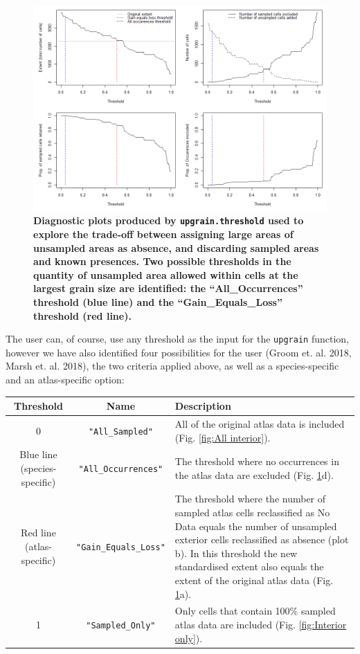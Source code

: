 \documentclass{article}[12pt, a4paper]
\begin{document}
\begin{figure}[ht]
\centering
\includegraphics[width=\linewidth]{Threshold_plots.png}
\caption{\textbf{Diagnostic plots produced by \texttt{upgrain.threshold} used to explore the trade-off  between assigning large areas of unsampled areas as absence, and discarding sampled areas and known presences. Two possible thresholds in the quantity of unsampled area allowed within cells at the largest grain size are identified: the “All\_Occurrences” threshold (blue line) and the “Gain\_Equals\_Loss” threshold (red line).}}
\label{fig:Threshold plots}
\end{figure}

The user can, of course, use any threshold as the input for the \texttt{upgrain} function, however we have also identified four possibilities for the user (Groom et. al. 2018, Marsh et. al. 2018), the two criteria applied above, as well as a species-specific and an atlas-specific option: 

\begin{table}[!h]
\centering
\begin{tabular}{ c  c  p{6.2cm} }
\hline \noalign{\smallskip}
Threshold & Name & Description  \\
\hline \noalign{\smallskip}
0 & \texttt{"All\_Sampled"} & All of the original atlas data is included (Fig. \ref{fig:All interior}). \\ [0.2cm]

Blue line (species-specific) & \texttt{"All\_Occurrences"} & The threshold where no occurrences in the atlas data are excluded (Fig. \ref{fig:Threshold plots}d). \\ [0.2cm]

Red line (atlas-specific) & \texttt{"Gain\_Equals\_Loss"} & The threshold where the number of sampled atlas cells reclassified as No Data equals the number of unsampled exterior cells reclassified as absence (plot b). In this threshold the new standardised extent also equals the extent of the original atlas data (Fig. \ref{fig:Threshold plots}a). \\ [0.2cm]

1 & \texttt{"Sampled\_Only"} & Only cells that contain 100\% sampled atlas data are included (Fig. \ref{fig:Interior only}). \\ [0.1cm]
\hline
\end{tabular}
\end{table}
\end{document}
